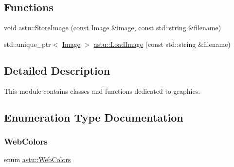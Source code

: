 \subsection*{Functions}
\begin{DoxyCompactItemize}
\item 
void \hyperlink{group__gfx__group_gaca5f9cb8047c60049300242c20d30cd6}{astu\+::\+Store\+Image} (const \hyperlink{classastu_1_1Image}{Image} \&image, const std\+::string \&filename)
\item 
std\+::unique\+\_\+ptr$<$ \hyperlink{classastu_1_1Image}{Image} $>$ \hyperlink{group__gfx__group_ga46ac561eac42d4ace785797db8bc89a0}{astu\+::\+Load\+Image} (const std\+::string \&filename)
\end{DoxyCompactItemize}


\subsection{Detailed Description}
This module contains classes and functions dedicated to graphics. 



\subsection{Enumeration Type Documentation}
\mbox{\label{group__gfx__group_ga6f6f9db1751e96b647084ecaedff2409}} 
\subsubsection{\texorpdfstring{Web\+Colors}{WebColors}}
{\footnotesize\ttfamily enum \hyperlink{group__gfx__group_ga6f6f9db1751e96b647084ecaedff2409}{astu\+::\+Web\+Colors}}

